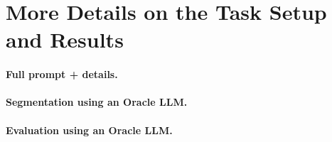 \section{More Details on the Task Setup and Results}
\label{app:task}

\paragraph{Full prompt + details.}

\paragraph{Segmentation using an Oracle LLM.}

\paragraph{Evaluation using an Oracle LLM.}